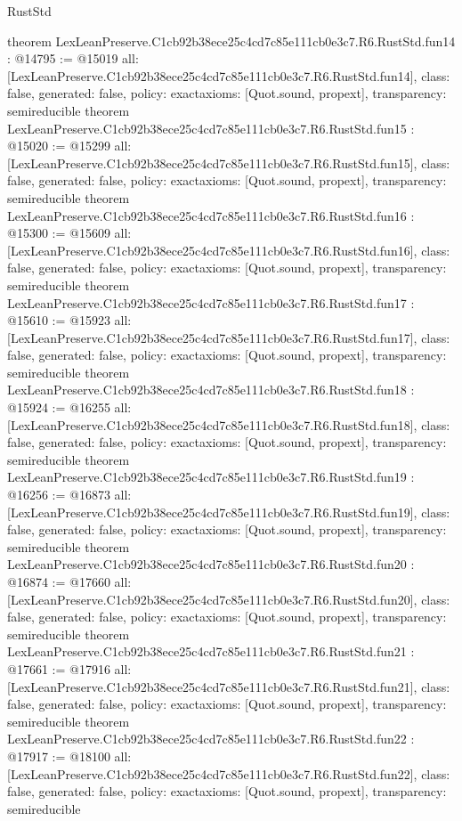 \begin{lexlean}{RustStd}
\begin{coremodule}
{}
theorem LexLeanPreserve.C1cb92b38ece25c4cd7c85e111cb0e3c7.R6.RustStd.fun14 : @14795 := @15019 {
  all: [LexLeanPreserve.C1cb92b38ece25c4cd7c85e111cb0e3c7.R6.RustStd.fun14],
  class: false,
  generated: false,
  policy: exact{axioms: [Quot.sound, propext]},
  transparency: semireducible
}
theorem LexLeanPreserve.C1cb92b38ece25c4cd7c85e111cb0e3c7.R6.RustStd.fun15 : @15020 := @15299 {
  all: [LexLeanPreserve.C1cb92b38ece25c4cd7c85e111cb0e3c7.R6.RustStd.fun15],
  class: false,
  generated: false,
  policy: exact{axioms: [Quot.sound, propext]},
  transparency: semireducible
}
theorem LexLeanPreserve.C1cb92b38ece25c4cd7c85e111cb0e3c7.R6.RustStd.fun16 : @15300 := @15609 {
  all: [LexLeanPreserve.C1cb92b38ece25c4cd7c85e111cb0e3c7.R6.RustStd.fun16],
  class: false,
  generated: false,
  policy: exact{axioms: [Quot.sound, propext]},
  transparency: semireducible
}
theorem LexLeanPreserve.C1cb92b38ece25c4cd7c85e111cb0e3c7.R6.RustStd.fun17 : @15610 := @15923 {
  all: [LexLeanPreserve.C1cb92b38ece25c4cd7c85e111cb0e3c7.R6.RustStd.fun17],
  class: false,
  generated: false,
  policy: exact{axioms: [Quot.sound, propext]},
  transparency: semireducible
}
theorem LexLeanPreserve.C1cb92b38ece25c4cd7c85e111cb0e3c7.R6.RustStd.fun18 : @15924 := @16255 {
  all: [LexLeanPreserve.C1cb92b38ece25c4cd7c85e111cb0e3c7.R6.RustStd.fun18],
  class: false,
  generated: false,
  policy: exact{axioms: [Quot.sound, propext]},
  transparency: semireducible
}
theorem LexLeanPreserve.C1cb92b38ece25c4cd7c85e111cb0e3c7.R6.RustStd.fun19 : @16256 := @16873 {
  all: [LexLeanPreserve.C1cb92b38ece25c4cd7c85e111cb0e3c7.R6.RustStd.fun19],
  class: false,
  generated: false,
  policy: exact{axioms: [Quot.sound, propext]},
  transparency: semireducible
}
theorem LexLeanPreserve.C1cb92b38ece25c4cd7c85e111cb0e3c7.R6.RustStd.fun20 : @16874 := @17660 {
  all: [LexLeanPreserve.C1cb92b38ece25c4cd7c85e111cb0e3c7.R6.RustStd.fun20],
  class: false,
  generated: false,
  policy: exact{axioms: [Quot.sound, propext]},
  transparency: semireducible
}
theorem LexLeanPreserve.C1cb92b38ece25c4cd7c85e111cb0e3c7.R6.RustStd.fun21 : @17661 := @17916 {
  all: [LexLeanPreserve.C1cb92b38ece25c4cd7c85e111cb0e3c7.R6.RustStd.fun21],
  class: false,
  generated: false,
  policy: exact{axioms: [Quot.sound, propext]},
  transparency: semireducible
}
theorem LexLeanPreserve.C1cb92b38ece25c4cd7c85e111cb0e3c7.R6.RustStd.fun22 : @17917 := @18100 {
  all: [LexLeanPreserve.C1cb92b38ece25c4cd7c85e111cb0e3c7.R6.RustStd.fun22],
  class: false,
  generated: false,
  policy: exact{axioms: [Quot.sound, propext]},
  transparency: semireducible
}
\end{coremodule}
\end{lexlean}
